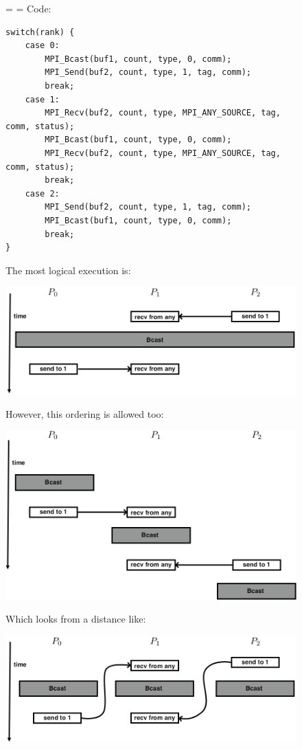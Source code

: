 \begin{figure}[p]
  \footnotesize
  \leftskip=\unitindent
  \rightskip=\unitindent
Code:
{\tiny
\begin{lstlisting}
switch(rank) { 
    case 0: 
        MPI_Bcast(buf1, count, type, 0, comm); 
        MPI_Send(buf2, count, type, 1, tag, comm); 
        break; 
    case 1: 
        MPI_Recv(buf2, count, type, MPI_ANY_SOURCE, tag, comm, status); 
        MPI_Bcast(buf1, count, type, 0, comm); 
        MPI_Recv(buf2, count, type, MPI_ANY_SOURCE, tag, comm, status); 
        break; 
    case 2: 
        MPI_Send(buf2, count, type, 1, tag, comm); 
        MPI_Bcast(buf1, count, type, 0, comm); 
        break; 
}
\end{lstlisting}
}
The most logical execution is:\par\medskip

\includegraphics[scale=.35]{graphics/backintime1}

However, this ordering is allowed too:\par\medskip

\includegraphics[scale=.35]{graphics/backintime2}

Which looks from a distance like:\par\medskip

\includegraphics[scale=.35]{graphics/backintime3}


\end{figure}
